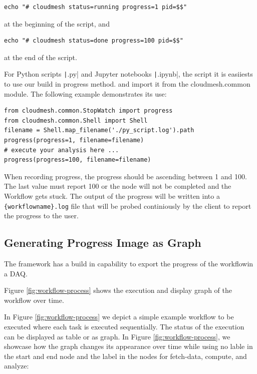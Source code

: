 \begin{verbatim}
echo "# cloudmesh status=running progress=1 pid=$$"
\end{verbatim}

at the beginning of the script, and

\begin{verbatim}
echo "# cloudmesh status=done progress=100 pid=$$"
\end{verbatim}

at the end of the script.


For Python scripts \texttt|.py| and Jupyter
notebooks \texttt|.ipynb|, the script it is easiiests to use
our build in progress method. and import it from the cloudmesh.common
module. The following example demonstrates its use:

\smallskip
\begin{verbatim}
from cloudmesh.common.StopWatch import progress
from cloudmesh.common.Shell import Shell
filename = Shell.map_filename('./py_script.log').path
progress(progress=1, filename=filename)
# execute your analysis here ...
progress(progress=100, filename=filename)
\end{verbatim}
\smallskip

When recording progress, the progress should be ascending between 1
and 100. The last value must report 100 or the node will not be
completed and the Workflow gets stuck.  The output of the progress
will be written into a \verb|{workflowname}.log| file that will be
probed continiously by the client to report the progress to the user.

\subsection{Generating Progress Image as Graph}

The framework has a build in capability to export the progress of the workflowin a DAQ. 

Figure \ref{fig:workflow-process} shows
the execution and display graph of the workflow
over time.


In Figure \ref{fig:workflow-process} we depict a simple example
workflow to be executed where each task is executed sequentially. The
status of the execution can be displayed as table or as graph. In
Figure \ref{fig:workflow-process}, we showcase how the graph changes
its appearance over time while using no lable in the start and end node and the label in the nodes for fetch-data, compute, and analyze:

